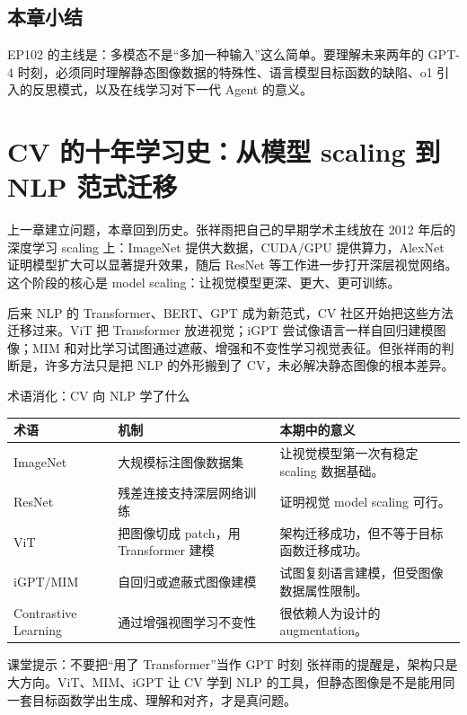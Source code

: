 \documentclass[a4paper]{article}
\begin{document}
\subsection{本章小结}

EP102 的主线是：多模态不是“多加一种输入”这么简单。要理解未来两年的 GPT-4 时刻，必须同时理解静态图像数据的特殊性、语言模型目标函数的缺陷、o1 引入的反思模式，以及在线学习对下一代 Agent 的意义。

\section{CV 的十年学习史：从模型 scaling 到 NLP 范式迁移}

上一章建立问题，本章回到历史。张祥雨把自己的早期学术主线放在 2012 年后的深度学习 scaling 上：ImageNet 提供大数据，CUDA/GPU 提供算力，AlexNet 证明模型扩大可以显著提升效果，随后 ResNet 等工作进一步打开深层视觉网络。这个阶段的核心是 model scaling：让视觉模型更深、更大、更可训练。

后来 NLP 的 Transformer、BERT、GPT 成为新范式，CV 社区开始把这些方法迁移过来。ViT 把 Transformer 放进视觉；iGPT 尝试像语言一样自回归建模图像；MIM 和对比学习试图通过遮蔽、增强和不变性学习视觉表征。但张祥雨的判断是，许多方法只是把 NLP 的外形搬到了 CV，未必解决静态图像的根本差异。

\begin{knowledgebox}{术语消化：CV 向 NLP 学了什么}
\noindent\begin{tabularx}{\textwidth}{p{}p{}X}
\toprule
术语 & 机制 & 本期中的意义 \\
\midrule
ImageNet & 大规模标注图像数据集 & 让视觉模型第一次有稳定 scaling 数据基础。 \\
ResNet & 残差连接支持深层网络训练 & 证明视觉 model scaling 可行。 \\
ViT & 把图像切成 patch，用 Transformer 建模 & 架构迁移成功，但不等于目标函数迁移成功。 \\
iGPT/MIM & 自回归或遮蔽式图像建模 & 试图复刻语言建模，但受图像数据属性限制。 \\
Contrastive Learning & 通过增强视图学习不变性 & 很依赖人为设计的 augmentation。 \\
\bottomrule
\end{tabularx}
\end{knowledgebox}

\begin{warningbox}{课堂提示：不要把“用了 Transformer”当作 GPT 时刻}
张祥雨的提醒是，架构只是大方向。ViT、MIM、iGPT 让 CV 学到 NLP 的工具，但静态图像是不是能用同一套目标函数学出生成、理解和对齐，才是真问题。
\end{warningbox}
\end{document}
